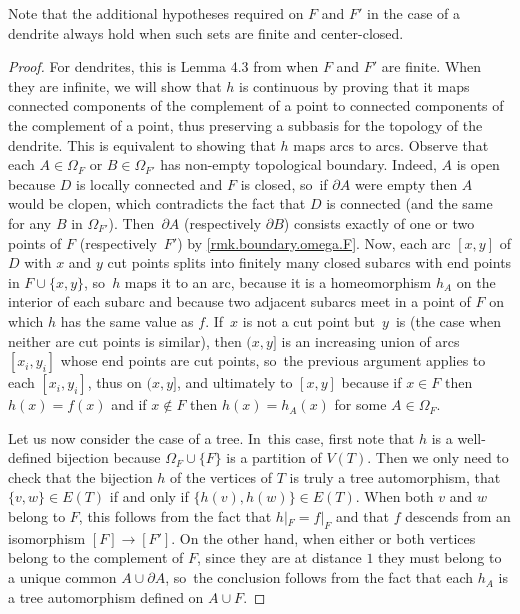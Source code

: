 \documentclass[JEP,XML,SOM,Unicode,NoFloatCountersInSection,published]{cedram}
\theoremstyle{plain}
\theoremstyle{definition}
\theoremstyle{remark}
\begin{document}
Note that the additional hypotheses required on $F$ and $F'$ in the case of a dendrite always hold when such sets are finite and center-closed.

\begin{proof}
For dendrites, this is Lemma 4.3 from \cite{Kaleidoscopic} when $F$ and $F'$ are finite.
When they are infinite,
we will show that $h$ is continuous by proving that it maps connected components of the complement of a point to connected components of the complement of a point, thus preserving a subbasis for the topology of the dendrite.
This is equivalent to showing that $h$ maps arcs to arcs.
Observe that each $A \in \Omega_F$ or $B \in \Omega_{F'}$ has non-empty topological boundary.
Indeed, $A$ is open because $D$ is locally connected and $F$ is closed, so~if $\partial A$ were empty then $A$ would be clopen, which contradicts the fact that $D$ is connected (and the same for any $B$ in $\Omega_{F'}$).
Then~$\partial A$ (respectively $\partial B$) consists exactly of one or two points of $F$ (respectively~$F'$) by \cref{rmk.boundary.omega.F}.
Now, each arc $[x,y]$ of $D$ with $x$ and $y$ cut points splits into finitely many closed subarcs with end points in $F \cup \{x,y\}$, so~$h$ maps it to an arc, because it is a homeomorphism $h_A$ on the interior of each subarc and because two adjacent subarcs meet in a point of $F$ on which $h$ has the same value as $f$. If~$x$ is not a cut point but~$y$~is (the case when neither are cut points is similar), then $(x,y]$ is an increasing union of arcs $[x_i,y_i]$ whose end points are cut points, so~the previous argument applies to each $[x_i,y_i]$, thus on $(x,y]$, and ultimately to $[x,y]$ because if $x \in F$ then $h(x)=f(x)$ and if $x \notin F$ then $h(x)=h_A(x)$ for some $A \in \Omega_F$.

Let us now consider the case of a tree. In~this case, first note that $h$ is a well-defined bijection because $\Omega_F \cup \{F\}$ is a partition of $V(T)$.
Then we only need to check that the bijection $h$ of the vertices of $T$ is truly a tree automorphism, \ie that $\{v,w\} \in E(T)$ if and only if $\{h(v),h(w)\} \in E(T)$.
When both $v$ and $w$ belong to $F$, this follows from the fact that $h|_F=f|_F$ and that $f$ descends from an isomorphism $[F] \to [F']$.
On the other hand, when either or both vertices belong to the complement of $F$, since they are at distance $1$ they must belong to a unique common $A \cup \partial A$, so~the conclusion follows from the fact that each $h_A$ is a tree automorphism defined on $A \cup F$.
\end{proof}
\end{document}
